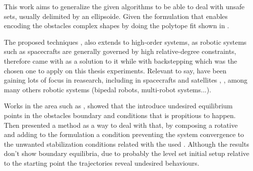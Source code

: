 
This work aims to generalize the given algorithms to be able to deal with unsafe sets, usually delimited by an ellipsoide. Given the  formulation that enables encoding the obstacles complex shapes by doing the polytope fit shown in \cite{molnar2023composing}.   

The proposed techniques , also extends to high-order systems, as robotic systems such as spacecrafts are generally governed by high relative-degree constraints, therefore \cite{ames2019control} came with  as a solution to it while \cite{taylor2022safe} with backstepping which was the chosen one to apply on this thesis experiments.
Relevant to say,  have been gaining lots of focus in reasearch, including in spacecrafts and satellites \cite{breeden2022predictive, breeden2021guaranteed},  \cite{singletary2021comparative}, among many others robotic systems \cite{ames2019control} (bipedal robots, multi-robot systems...). 

Works in the area such as \cite{reis2020control}, showed that the  \cite{ames2019control} introduce undesired equilibrium points in the obstacles boundary and conditions that is propitious to happen. Then \cite{reis2020control} presented a method as a way to deal with that, by composing a rotative  and adding to the  formulation a  condition preventing the system convergence to the unwanted stabilization conditions related with the used . Although the results don't show boundary equilibria, due to probably the  level set initial setup relative to the starting point the trajectories reveal undesired behaviours.

